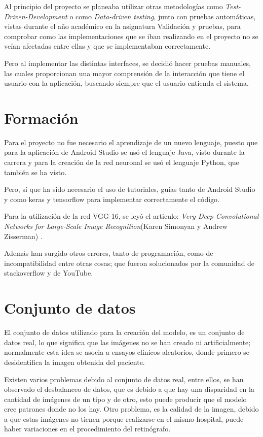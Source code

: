 Al principio del proyecto se planeaba utilizar otras metodologías como \textit{Test-Driven-Development} o como \textit{Data-driven testing}, junto con pruebas automáticas, vistas durante el año académico en la asignatura Validación y pruebas, para comprobar como las implementaciones que se iban realizando en el proyecto no se veían afectadas entre ellas y que se implementaban correctamente. 

Pero al implementar las distintas interfaces, se decidió hacer pruebas manuales, las cuales proporcionan una mayor comprensión de la interacción que tiene el usuario con la aplicación, buscando siempre que el usuario entienda el sistema.

\section{Formación}

Para el proyecto no fue necesario el aprendizaje de un nuevo lenguaje, puesto que para la aplicación de Android Studio se usó el lenguaje Java, visto durante la carrera y para la creación de la red neuronal se usó el lenguaje Python, que también se ha visto. 

Pero, sí que ha sido necesario el uso de tutoriales, guías tanto de Android Studio y como keras y tensorflow para implementar correctamente el código.

Para la utilización de la red VGG-16, se leyó el articulo: \textit{Very Deep Convolutional Networks for Large-Scale Image Recognition}(Karen Simonyan y Andrew Zisserman) \cite{simonyan2015deep}.

Además han surgido otros errores, tanto de programación, como de incompatibilidad entre otras cosas; que fueron solucionados por la comunidad de stackoverflow y de YouTube.


\section{Conjunto de datos}

El conjunto de datos utilizado para la creación del modelo, es un conjunto de datos real, lo que significa que las imágenes no se han creado ni artificialmente; normalmente esta idea se asocia a ensayos clínicos aleatorios, donde primero se desidentifica la imagen obtenida del paciente.

Existen varios problemas debido al conjunto de datos real, entre ellos, se han observado el desbalanceo de datos, que es debido a que hay una disparidad en la cantidad de imágenes de un tipo y de otro, esto puede producir que el modelo cree patrones donde no los hay.
Otro problema, es la calidad de la imagen, debido a que estas imágenes no tienen porque realizarse en el mismo hospital, puede haber variaciones en el procedimiento del retinógrafo.

